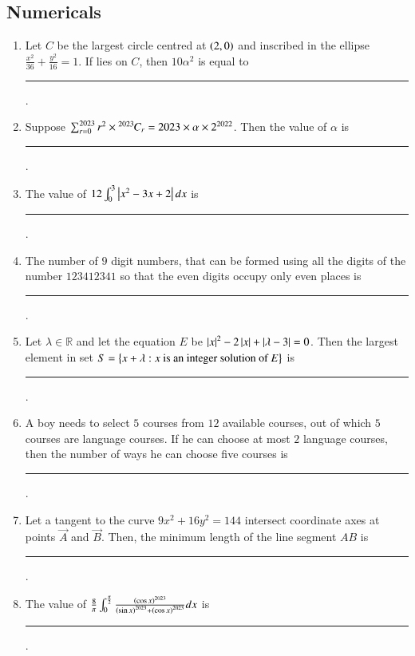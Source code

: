 \documentclass[journal,12pt,onecolumn]{IEEEtran}
\theoremstyle{remark}
\begin{document}
\subsection{Numericals}
\begin{enumerate}

\item Let $C$ be the largest circle centred at $\left(2,0\right)$ and inscribed in the ellipse $\frac{x^2}{36}+\frac{y^2}{16}=1$. If  lies on $C$, then $10\alpha^2$ is equal to \rule{1cm}{0.15mm}.

\hfill{}

\item Suppose $\sum_{r=0}^{2023}r^2\times{{}^{2023}\mkern-1muC_{r}} = 2023\times\alpha\times 2^{2022}$. Then the value of $\alpha$ is \rule{1cm}{0.15mm}.

\hfill{}

\item The value of $12\int_{0}^{3}\left\vert x^2-3x+2\right\vert dx$ is \rule{1cm}{0.15mm}.

\hfill{}

\item The number of $9$ digit numbers, that can be formed using all the digits of the number $123412341$ so that the even digits occupy only even places is \rule{1cm}{0.15mm}.

\hfill{}

\item Let $\lambda \in \mathbb{R}$ and let the equation $E$ be $\left\vert x\right\vert^2-2\left\vert x\right\vert+\left\vert\lambda-3\right\vert=0$. Then the largest element in set $S=\left\{x+\lambda:x\text{ is an integer solution of }E\right\}$ is \rule{1cm}{0.15mm}.

\hfill{}

\item A boy needs to select $5$ courses from $12$ available courses, out of which $5$ courses are language courses. If  he can choose at most $2$ language courses, then the number of ways he can choose five courses is \rule{1cm}{0.15mm}.

\hfill{}

\item Let a tangent to the curve $9x^2+16y^2=144$ intersect coordinate axes at points $\vec{A}$ and $\vec{B}$. Then, the minimum length of the line segment $AB$ is \rule{1cm}{0.15mm}.

\hfill{}

\item The value of $\frac{8}{\pi}\int_{0}^{\frac{\pi}{2}}\frac{\left(\cos x\right)^{2023}}{\left(\sin x\right)^{2023}+\left(\cos x\right)^{2023}}dx$ is \rule{1cm}{0.15mm}. 


\end{enumerate}
\end{document}
